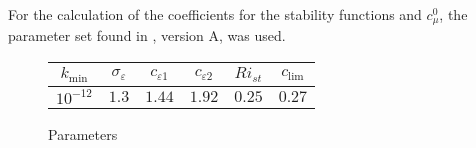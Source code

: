For the calculation of the coefficients for the stability functions and 
$c_\mu^0$, the parameter set found in \cite{Canuto2001}, version A, was used.

\begin{figure}[ht]
\begin{tabular}{cccccc}
  $k_{\min}$ & $\sigma_\varepsilon$ & $c_{\varepsilon 1}$ & 
$c_{\varepsilon 2}$ & $Ri_{st}$ & $c_{\lim}$\\
\hline
$10^{-12}$ & $1.3$ & $1.44$ & $1.92$ & $0.25$ & $0.27$ \\
 \end{tabular}
\caption{Parameters}\label{tabellchen}
\end{figure}